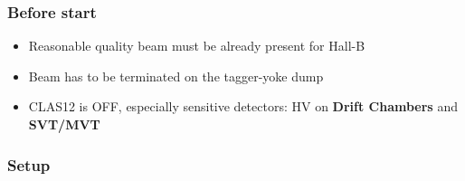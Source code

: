 \subsubsection{Before start}

\begin{itemize}
\item Reasonable quality beam must be already present for Hall-B
\item Beam has to be terminated on the tagger-yoke dump
\item CLAS12 is OFF, especially sensitive detectors: HV on \textbf{Drift Chambers} and \textbf{SVT/MVT}
\end{itemize}


\subsubsection{Setup }

